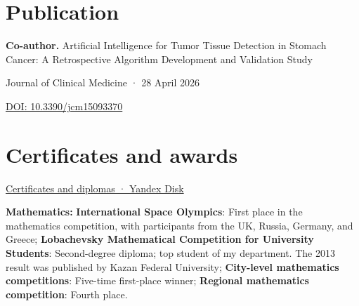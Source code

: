 \documentclass[a4paper]{twentysecondcv}
\begin{document}
\par\vspace{5pt}
\section{Publication}\par\vspace{6pt}
\textbf{Co-author.} Artificial Intelligence for Tumor Tissue Detection in Stomach Cancer: A Retrospective Algorithm Development and Validation Study\par
\vspace{4pt}
Journal of Clinical Medicine · 28 April 2026\par
\href{https://doi.org/10.3390/jcm15093370}{DOI: 10.3390/jcm15093370}
\par\vspace{7pt}
\section{Certificates and awards}\par\vspace{6pt}
\href{https://yadi.sk/d/aSyzcZ44-\_l-8w?w=1}{Certificates and diplomas · Yandex Disk}\par\vspace{4pt}
\textbf{Mathematics:} \textbf{International Space Olympics}: First place in the mathematics competition, with participants from the UK, Russia, Germany, and Greece; \textbf{Lobachevsky Mathematical Competition for University Students}: Second-degree diploma; top student of my department. The 2013 result was published by Kazan Federal University; \textbf{City-level mathematics competitions}: Five-time first-place winner; \textbf{Regional mathematics competition}: Fourth place.
\end{document}

